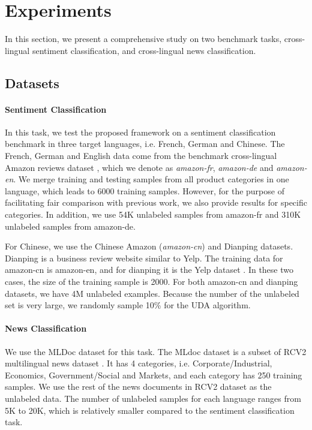 \documentclass{article} \usepackage{iclr2020_conference,times}
\begin{document}
 \section{Experiments}
\label{sec:experiment}

In this section, we present a comprehensive study on two benchmark tasks, cross-lingual sentiment classification, and cross-lingual news classification.

\subsection{Datasets}

\paragraph{Sentiment Classification}
In this task, we test the proposed framework on a sentiment classification benchmark in three target languages, i.e. French, German and Chinese. 
The French, German and English data come from the benchmark cross-lingual Amazon reviews dataset \citep{prettenhofer2010cross}, which we denote as \textit{amazon-fr}, \textit{amazon-de} and \textit{amazon-en}. 
We merge training and testing samples from all product categories in one language, which leads to 6000 training samples. 
However, for the purpose of facilitating fair comparison with previous work, we also provide results for specific categories. 
In addition, we use 54K unlabeled samples from amazon-fr and 310K unlabeled samples from amazon-de.


For Chinese, we use the Chinese Amazon (\textit{amazon-cn}) \citep{zhang2015daily} and Dianping \citep{zhang2014explicit} datasets. Dianping is a business review website similar to Yelp. The training data for amazon-cn is amazon-en, and for dianping it is the Yelp dataset \citep{zhang2015character}. 
In these two cases, the size of the training sample is 2000. For both amazon-cn and dianping datasets, we have 4M unlabeled examples. 
Because the number of the unlabeled set is very large, we randomly sample 10\% for the UDA algorithm. 

\paragraph{News Classification} We use the MLDoc dataset \citep{schwenk2018corpus} for this task. The MLdoc dataset is a subset of RCV2 multilingual news dataset \citep{lewis2004rcv1}. It has 4 categories, i.e.  Corporate/Industrial, Economics, Government/Social and Markets, and each category has 250 training samples. We use the rest of the news documents in RCV2 dataset as the unlabeled data. The number of unlabeled samples for each language ranges from 5K to 20K, which is relatively smaller compared to the sentiment classification task. 
\end{document}
